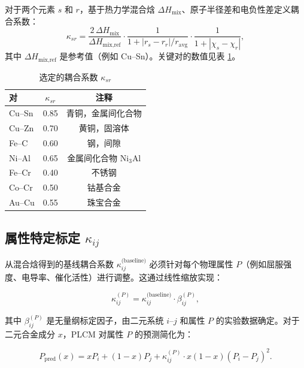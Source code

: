 \documentclass[12pt,a4paper]{article}
\begin{document}
	对于两个元素 \(s\) 和 \(r\)，基于热力学混合焓 \(\Delta H_{\text{mix}}\)、原子半径差和电负性差定义耦合系数：
	\[
	\kappa_{sr} = \frac{2\,\Delta H_{\text{mix}}}{\Delta H_{\text{mix,ref}}} \cdot
	\frac{1}{1 + |r_s - r_r|/r_{\text{avg}}} \cdot
	\frac{1}{1 + |\chi_s - \chi_r|},
	\]
	其中 \(\Delta H_{\text{mix,ref}}\) 是参考值（例如 Cu–Sn）。关键对的数值见表 \ref{tab:kappa}。
	
	\begin{table}[htbp]
		\centering
		\caption{选定的耦合系数 \(\kappa_{sr}\)}
		\label{tab:kappa}
		\begin{tabular}{lcc}
			\toprule
			对 & \(\kappa_{sr}\) & 注释 \\
			\midrule
			Cu–Sn & 0.85 & 青铜，金属间化合物 \\
			Cu–Zn & 0.70 & 黄铜，固溶体 \\
			Fe–C  & 0.60 & 钢，间隙 \\
			Ni–Al & 0.65 & 金属间化合物 Ni\(_{3}\)Al \\
			Fe–Cr & 0.40 & 不锈钢 \\
			Co–Cr & 0.50 & 钴基合金 \\
			Au–Cu & 0.55 & 珠宝合金 \\
			\bottomrule
		\end{tabular}
	\end{table}
	
	\subsection{属性特定标定 \(\kappa_{ij}\)}
	\label{subsec:property-calibration}
	
	从混合焓得到的基线耦合系数 \(\kappa_{ij}^{\text{(baseline)}}\) 必须针对每个物理属性 \(P\)（例如屈服强度、电导率、催化活性）进行调整。这通过线性缩放实现：
	
	\begin{equation}
		\kappa_{ij}^{(P)} = \kappa_{ij}^{\text{(baseline)}} \cdot \beta_{ij}^{(P)},
		\label{eq:kappa-calibration}
	\end{equation}
	
	其中 \(\beta_{ij}^{(P)}\) 是无量纲标定因子，由二元系统 \(i\)–\(j\) 和属性 \(P\) 的实验数据确定。对于二元合金成分 \(x\)，PLCM 对属性 \(P\) 的预测简化为：
	
	\begin{equation}
		P_{\text{pred}}(x) = x P_i + (1-x) P_j + \kappa_{ij}^{(P)} \cdot x(1-x) (P_i - P_j)^2.
		\label{eq:binary-prediction}
	\end{equation}
	
\end{document}
